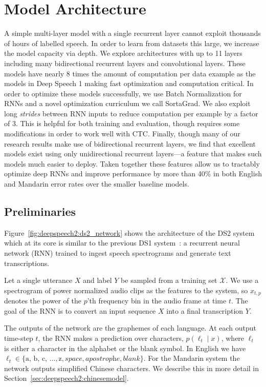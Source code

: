 \section{Model Architecture}
\label{sec:deepspeech2:model}

A simple multi-layer model with a single recurrent layer cannot exploit
thousands of hours of labelled speech. In order to learn from datasets this
large, we increase the model capacity via depth. We explore architectures with
up to 11 layers including many bidirectional recurrent layers and convolutional
layers. These models have nearly 8 times the amount of computation per data
example as the models in Deep Speech 1 making fast optimization and computation
critical. In order to optimize these models successfully, we use Batch
Normalization for RNNs and a novel optimization curriculum we call SortaGrad.
We also exploit long \emph{strides} between RNN inputs to reduce computation
per example by a factor of 3. This is helpful for both training and evaluation,
though requires some modifications in order to work well with CTC. Finally,
though many of our research results make use of bidirectional recurrent layers,
we find that excellent models exist using only unidirectional recurrent
layers---a feature that makes such models much easier to deploy.  Taken
together these features allow us to tractably optimize deep RNNs and improve
performance by more than 40\% in both English and Mandarin error rates over the
smaller baseline models.

\subsection{Preliminaries}

Figure~\ref{fig:deepspeech2:ds2_network} shows the architecture of the DS2
system which at its core is similar to the previous DS1
system~\cite{hannun2014deepspeech}: a recurrent neural network (RNN) trained to
ingest speech spectrograms and generate text transcriptions. 

Let a single utterance $X$ and label $Y$ be sampled from a training set
$\mathcal{X}$. We use a spectrogram of power normalized audio clips as the
features to the system, so $x_{t,p}$ denotes the power of the $p$'th frequency
bin in the audio frame at time $t$. The goal of the RNN is to convert an input
sequence $X$ into a final transcription $Y$.

The outputs of the network are the graphemes of each language. At each output
time-step $t$, the RNN makes a prediction over characters, $p(\ell_t \mid x)$,
where $\ell_t$ is either a character in the alphabet or the blank symbol. In
English we have $\ell_t \in \{\textrm{a, b, c, }\ldots, \textrm{z},
\textit{space}, \textit{apostrophe}, \textit{blank}\}$. For the Mandarin system
the network outputs simplified Chinese characters. We describe this in more
detail in Section~\ref{sec:deepspeech2:chinesemodel}.

